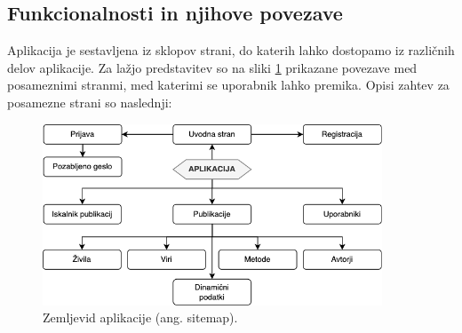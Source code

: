 \documentclass[a4paper, 12pt]{book}
\begin{document}
\subsection{Funkcionalnosti in njihove povezave}
Aplikacija je sestavljena iz sklopov strani, do katerih lahko dostopamo iz različnih delov aplikacije. Za lažjo predstavitev so na sliki \ref{sitemap} prikazane povezave med posameznimi stranmi, med katerimi se uporabnik lahko premika. Opisi zahtev za posamezne strani so naslednji:


\begin{figure}[h]
\begin{center}
\includegraphics[width=0.9\textwidth]{slike/page-map.png}
\end{center}
\caption{ Zemljevid aplikacije (ang. sitemap). }
\label{sitemap}
\end{figure}
\end{document}
